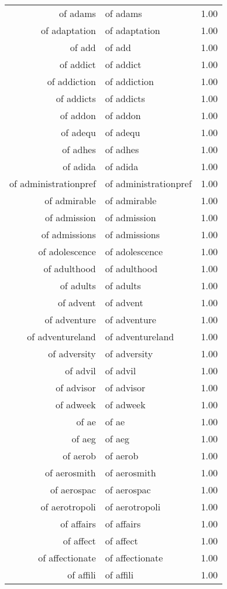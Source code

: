 \begin{table}[ht]
\begin{tabular}{rlr}
  of adams & of adams & 1.00 \\ 
  of adaptation & of adaptation & 1.00 \\ 
  of add & of add & 1.00 \\ 
  of addict & of addict & 1.00 \\ 
  of addiction & of addiction & 1.00 \\ 
  of addicts & of addicts & 1.00 \\ 
  of addon & of addon & 1.00 \\ 
  of adequ & of adequ & 1.00 \\ 
  of adhes & of adhes & 1.00 \\ 
  of adida & of adida & 1.00 \\ 
  of administrationpref & of administrationpref & 1.00 \\ 
  of admirable & of admirable & 1.00 \\ 
  of admission & of admission & 1.00 \\ 
  of admissions & of admissions & 1.00 \\ 
  of adolescence & of adolescence & 1.00 \\ 
  of adulthood & of adulthood & 1.00 \\ 
  of adults & of adults & 1.00 \\ 
  of advent & of advent & 1.00 \\ 
  of adventure & of adventure & 1.00 \\ 
  of adventureland & of adventureland & 1.00 \\ 
  of adversity & of adversity & 1.00 \\ 
  of advil & of advil & 1.00 \\ 
  of advisor & of advisor & 1.00 \\ 
  of adweek & of adweek & 1.00 \\ 
  of ae & of ae & 1.00 \\ 
  of aeg & of aeg & 1.00 \\ 
  of aerob & of aerob & 1.00 \\ 
  of aerosmith & of aerosmith & 1.00 \\ 
  of aerospac & of aerospac & 1.00 \\ 
  of aerotropoli & of aerotropoli & 1.00 \\ 
  of affairs & of affairs & 1.00 \\ 
  of affect & of affect & 1.00 \\ 
  of affectionate & of affectionate & 1.00 \\ 
  of affili & of affili & 1.00 \\ 

\end{tabular}
\end{table}
